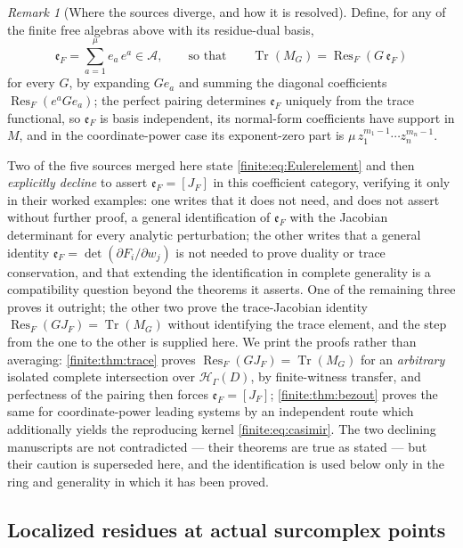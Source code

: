 \documentclass[11pt,letterpaper]{article}
\theoremstyle{definition}
\theoremstyle{remark}
\newtheorem{remark}[theorem]{Remark}
\newcommand{\HH}{\mathscr H}
\newcommand{\Alg}{\mathcal A}
\newcommand{\Eul}{\mathfrak e}
\DeclareMathOperator{\Res}{Res}
\DeclareMathOperator{\Tr}{Tr}
\numberwithin{equation}{section}
\begin{document}
\begin{remark}[Where the sources diverge, and how it is resolved]
\label{finite:rem:eulerconflict}
Define, for any of the finite free algebras above with its residue-dual basis,
\begin{equation}\label{finite:eq:Eulerelement}
 \Eul_F=\sum_{a=1}^{\mu}e_a\,e^a\in\Alg,
 \qquad\text{so that}\qquad
 \Tr(M_G)=\Res_F(G\,\Eul_F)
\end{equation}
for every $G$, by expanding $Ge_a$ and summing the diagonal coefficients $\Res_F(e^aGe_a)$; the perfect pairing determines $\Eul_F$ uniquely from the trace functional, so $\Eul_F$ is basis independent, its normal-form coefficients have support in $M$, and in the coordinate-power case its exponent-zero part is $\mu\,z_1^{m_1-1}\cdots z_n^{m_n-1}$.

Two of the five sources merged here state \eqref{finite:eq:Eulerelement} and then \emph{explicitly decline} to assert $\Eul_F=[J_F]$ in this coefficient category, verifying it only in their worked examples: one writes that it does not need, and does not assert without further proof, a general identification of $\Eul_F$ with the Jacobian determinant for every analytic perturbation; the other writes that a general identity $\Eul_F=\det(\partial F_i/\partial w_j)$ is not needed to prove duality or trace conservation, and that extending the identification in complete generality is a compatibility question beyond the theorems it asserts. One of the remaining three proves it outright; the other two prove
the trace-Jacobian identity $\Res_F(GJ_F)=\Tr(M_G)$ without identifying the
trace element, and the step from the one to the other is supplied here. We print the proofs rather than averaging: \cref{finite:thm:trace} proves $\Res_F(GJ_F)=\Tr(M_G)$ for an \emph{arbitrary} isolated complete intersection over $\HH_\Gamma(D)$, by finite-witness transfer, and perfectness of the pairing then forces $\Eul_F=[J_F]$; \cref{finite:thm:bezout} proves the same for coordinate-power leading systems by an independent route which additionally yields the reproducing kernel \eqref{finite:eq:casimir}. The two declining manuscripts are not contradicted --- their theorems are true as stated --- but their caution is superseded here, and the identification is used below only in the ring and generality in which it has been proved.
\end{remark}

\subsection{Localized residues at actual surcomplex points}
\label{finite:sec:localres}
\end{document}
